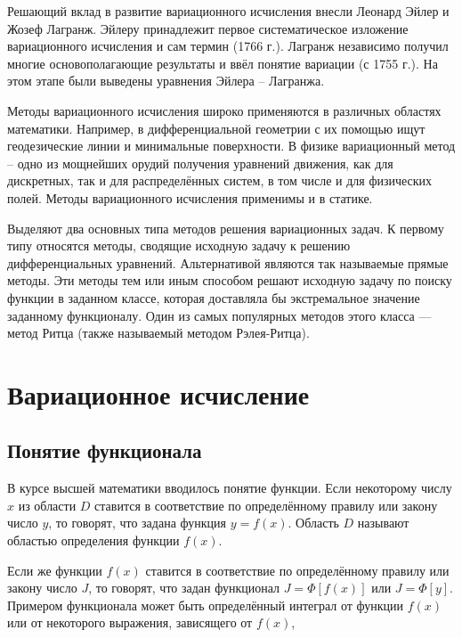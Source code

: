 \documentclass{article}
\begin{document}
Решающий вклад в развитие вариационного исчисления внесли Леонард Эйлер и Жозеф Лагранж. Эйлеру принадлежит первое систематическое изложение вариационного исчисления и сам термин (1766 г.). Лагранж независимо получил многие основополагающие результаты и ввёл понятие вариации (с 1755 г.). На этом этапе были выведены уравнения Эйлера – Лагранжа.

Методы вариационного исчисления широко применяются в различных областях математики. Например, в дифференциальной геометрии с их помощью ищут геодезические линии и минимальные поверхности. В физике вариационный метод – одно из мощнейших орудий получения уравнений движения, как для дискретных, так и для распределённых систем, в том числе и для физических полей. Методы вариационного исчисления применимы и в статике.

Выделяют два основных типа методов решения вариационных задач. К первому типу относятся методы, сводящие исходную задачу к решению дифференциальных уравнений. Альтернативой являются так называемые прямые методы. Эти методы тем или иным способом решают исходную задачу по поиску функции в заданном классе, которая доставляла бы экстремальное значение заданному функционалу. Один из самых популярных методов этого класса — метод Ритца (также называемый методом Рэлея-Ритца).


\newpage

\section{Вариационное исчисление}

\subsection{Понятие функционала}

В курсе высшей математики вводилось понятие функции. Если некоторому числу $x$ из области $D$ ставится в соответствие по определённому правилу или закону число $y$, то говорят, что задана функция $y=f(x)$. Область $D$ называют областью определения функции $f(x)$.

Если же функции $f(x)$ ставится в соответствие по определённому правилу или закону число $J$, то говорят, что задан функционал $J = \Phi[f(x)]$ или 
$J = \Phi[y]$. Примером функционала может быть определённый интеграл от функции $f(x)$ или от некоторого выражения, зависящего от $f(x)$,
\end{document}
